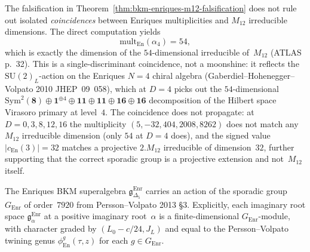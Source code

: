 \begin{remark}
\label{rem:bkm-enriques-m12-coincidences}
The falsification in Theorem~\ref{thm:bkm-enriques-m12-falsification}
does not rule out isolated \emph{coincidences} between Enriques
multiplicities and $M_{12}$ irreducible dimensions. The direct
computation yields
\[
 \mathrm{mult}_{\mathrm{En}}(\alpha_4) = 54,
\]
which is exactly the dimension of the $54$-dimensional
irreducible of~$M_{12}$ (ATLAS p.~32). This is a single-discriminant
coincidence, not a moonshine: it reflects the $\mathrm{SU}(2)_L$-action
on the Enriques $N = 4$ chiral algebra (Gaberdiel--Hohenegger--Volpato
2010 JHEP~09~058), which at $D = 4$ picks out the $54$-dimensional
$\mathrm{Sym}^2(\mathbf{8}) \oplus \mathbf{1}^{\oplus 4} \oplus
\mathbf{11}\oplus\mathbf{11}\oplus\mathbf{16}\oplus\mathbf{16}$
decomposition of the Hilbert space Virasoro primary at level~$4$.
The coincidence does not propagate: at $D = 0, 3, 8, 12, 16$ the
multiplicity $(5, -32, 404, 2008, 8262)$ does not match any $M_{12}$
irreducible dimension (only $54$ at $D = 4$ does), and the signed
value $|c_{\mathrm{En}}(3)| = 32$ matches a projective $2.M_{12}$
irreducible of dimension~$32$, further supporting that the correct
sporadic group is a projective extension and not~$M_{12}$ itself.
\end{remark}

\begin{conjecture}
\label{conj:bkm-enriques-persson-volpato}
The Enriques BKM superalgebra
$\mathfrak{g}_{\Delta_5}^{\mathrm{Enr}}$ carries an action of the
sporadic group~$G_{\mathrm{Enr}}$ of order~$7920$ from
Persson--Volpato 2013 \S 3. Explicitly, each imaginary root space
$\mathfrak{g}_\alpha^{\mathrm{Enr}}$ at a positive imaginary
root~$\alpha$ is a finite-dimensional $G_{\mathrm{Enr}}$-module,
with character graded by $(L_0 - c/24, J_L)$ and equal to the
Persson--Volpato twining genus $\phi^g_{\mathrm{En}}(\tau, z)$
for each $g\in G_{\mathrm{Enr}}$.
\end{conjecture}

